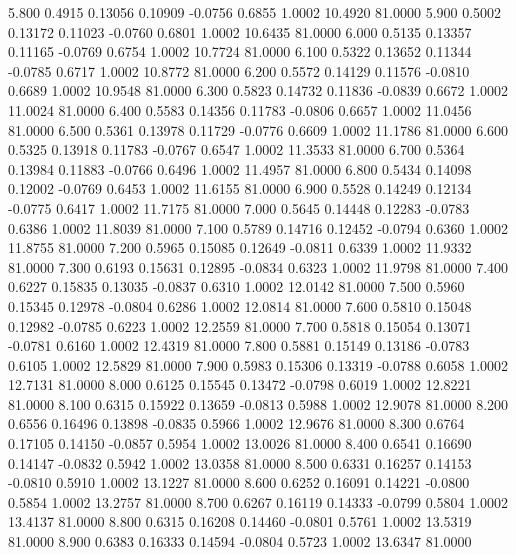    5.800   0.4915   0.13056   0.10909  -0.0756   0.6855   1.0002  10.4920  81.0000
   5.900   0.5002   0.13172   0.11023  -0.0760   0.6801   1.0002  10.6435  81.0000
   6.000   0.5135   0.13357   0.11165  -0.0769   0.6754   1.0002  10.7724  81.0000
   6.100   0.5322   0.13652   0.11344  -0.0785   0.6717   1.0002  10.8772  81.0000
   6.200   0.5572   0.14129   0.11576  -0.0810   0.6689   1.0002  10.9548  81.0000
   6.300   0.5823   0.14732   0.11836  -0.0839   0.6672   1.0002  11.0024  81.0000
   6.400   0.5583   0.14356   0.11783  -0.0806   0.6657   1.0002  11.0456  81.0000
   6.500   0.5361   0.13978   0.11729  -0.0776   0.6609   1.0002  11.1786  81.0000
   6.600   0.5325   0.13918   0.11783  -0.0767   0.6547   1.0002  11.3533  81.0000
   6.700   0.5364   0.13984   0.11883  -0.0766   0.6496   1.0002  11.4957  81.0000
   6.800   0.5434   0.14098   0.12002  -0.0769   0.6453   1.0002  11.6155  81.0000
   6.900   0.5528   0.14249   0.12134  -0.0775   0.6417   1.0002  11.7175  81.0000
   7.000   0.5645   0.14448   0.12283  -0.0783   0.6386   1.0002  11.8039  81.0000
   7.100   0.5789   0.14716   0.12452  -0.0794   0.6360   1.0002  11.8755  81.0000
   7.200   0.5965   0.15085   0.12649  -0.0811   0.6339   1.0002  11.9332  81.0000
   7.300   0.6193   0.15631   0.12895  -0.0834   0.6323   1.0002  11.9798  81.0000
   7.400   0.6227   0.15835   0.13035  -0.0837   0.6310   1.0002  12.0142  81.0000
   7.500   0.5960   0.15345   0.12978  -0.0804   0.6286   1.0002  12.0814  81.0000
   7.600   0.5810   0.15048   0.12982  -0.0785   0.6223   1.0002  12.2559  81.0000
   7.700   0.5818   0.15054   0.13071  -0.0781   0.6160   1.0002  12.4319  81.0000
   7.800   0.5881   0.15149   0.13186  -0.0783   0.6105   1.0002  12.5829  81.0000
   7.900   0.5983   0.15306   0.13319  -0.0788   0.6058   1.0002  12.7131  81.0000
   8.000   0.6125   0.15545   0.13472  -0.0798   0.6019   1.0002  12.8221  81.0000
   8.100   0.6315   0.15922   0.13659  -0.0813   0.5988   1.0002  12.9078  81.0000
   8.200   0.6556   0.16496   0.13898  -0.0835   0.5966   1.0002  12.9676  81.0000
   8.300   0.6764   0.17105   0.14150  -0.0857   0.5954   1.0002  13.0026  81.0000
   8.400   0.6541   0.16690   0.14147  -0.0832   0.5942   1.0002  13.0358  81.0000
   8.500   0.6331   0.16257   0.14153  -0.0810   0.5910   1.0002  13.1227  81.0000
   8.600   0.6252   0.16091   0.14221  -0.0800   0.5854   1.0002  13.2757  81.0000
   8.700   0.6267   0.16119   0.14333  -0.0799   0.5804   1.0002  13.4137  81.0000
   8.800   0.6315   0.16208   0.14460  -0.0801   0.5761   1.0002  13.5319  81.0000
   8.900   0.6383   0.16333   0.14594  -0.0804   0.5723   1.0002  13.6347  81.0000
